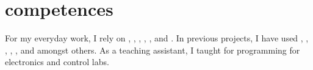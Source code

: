 \documentclass[]{cv-egeerardyn}
\begin{document}
\begin{languages}
\end{languages}
\section{competences}

For my everyday work, I rely on , , , , ,  and . 
In previous projects, I have used , , , , ,  and  amongst others. 
As a teaching assistant, I taught  for  programming for electronics and control labs.
\end{document}
